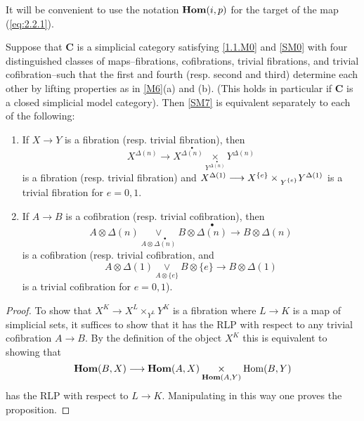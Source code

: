 \documentclass[../main]{subfiles}
\begin{document}
\begin{conv}
It will be convenient to use the notation $\operatorname{\mathbf{Hom}}(i,p)$ for the target of the map (\ref{eq:2.2.1}).

\end{conv} 
\begin{proposition}\label{prop:2.2.3}
    Suppose that $\mathbf{C}$ is a simplicial category satisfying \ref{1.1.M0} and \ref{SM0} with four distinguished classes of maps--fibrations, cofibrations, trivial fibrations, and trivial cofibration--such that the first and fourth (resp. second and third) determine each other by lifting properties as in \ref{M6}(a) and (b). (This holds in particular if $\mathbf{C}$ is a closed simplicial model category). Then \ref{SM7} is equivalent separately to each of the following:
    \begin{enumerate}[label = SM7(\alph*)]
        \item\label{SM7a} If $X \longrightarrow  Y$ is a fibration (resp. trivial fibration), then \[X^{\Delta(n)} \longrightarrow   X^{\overset{\bullet}{\Delta(n)}} \underset{Y^{\overset{\bullet}{\Delta(n)}}}{\times} Y^{\Delta(n)}\] is a fibration (resp. trivial fibration) and $X^{\Delta(1)} \longrightarrow  X^{\{e\}} \times \prescript{}{Y^{\{e\}}}{Y}^{\Delta(1)}$ is a trivial fibration for $e=0,1$. 
        \item\label{SM7b} If $A \longrightarrow  B$ is a cofibration (resp. trivial cofibration), then 
        \[
        A \otimes \Delta (n) \underset{A \otimes \overset{\bullet}{\Delta(n)}}{\vee} B\otimes \overset{\bullet}{\Delta(n)} \longrightarrow  B \otimes \Delta(n)
        \] 
        is a cofibration (resp. trivial cofibration, and 
        \[
        A \otimes \Delta(1) \underset{A \otimes \{e\}}{\vee} B \otimes \{e\} \longrightarrow  B \otimes \Delta(1)
        \] 
        is a trivial cofibration for $e=0,1$).
    \end{enumerate}
\end{proposition}

\begin{proof}
     To show that $X^K \longrightarrow  X^L \times_{Y^L} Y^K$ is a fibration where $L \longrightarrow  K$ is a map of simplicial sets, it suffices to show that it has the RLP with respect to any trivial cofibration $A \longrightarrow  B$. By the definition of the object $X^K$ this is equivalent to showing that \[\operatorname{\mathbf{Hom}}(B,X) \longrightarrow  \operatorname{\mathbf{Hom}}(A,X) \underset{\operatorname{\mathbf{Hom}}(A,Y)}{\times} \operatorname{Hom}(B,Y)\] has the RLP with respect to $L \longrightarrow  K$. Manipulating in this way one proves the proposition.
\end{proof}
\end{document}

